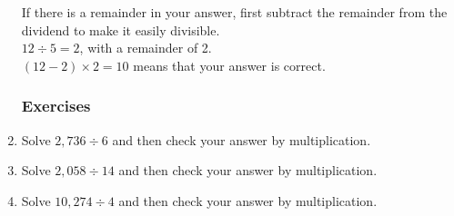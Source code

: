 \documentclass{article}
\begin{document}
\begin{enumerate}
If there is a  remainder in your answer, first subtract the remainder from the dividend to make it easily divisible.\\

$12 \div 5 = 2$, with a remainder of 2.\\

$(12 - 2) \times 2 = 10$ means that your answer is correct.\\

\subsubsection{Exercises}

\item Solve $2,736 \div 6$ and then check your answer by multiplication.
\item Solve $2,058 \div 14$ and then check your answer by multiplication.
\item Solve $10,274 \div 4$ and then check your answer by multiplication.

\end{enumerate}
\end{document}
